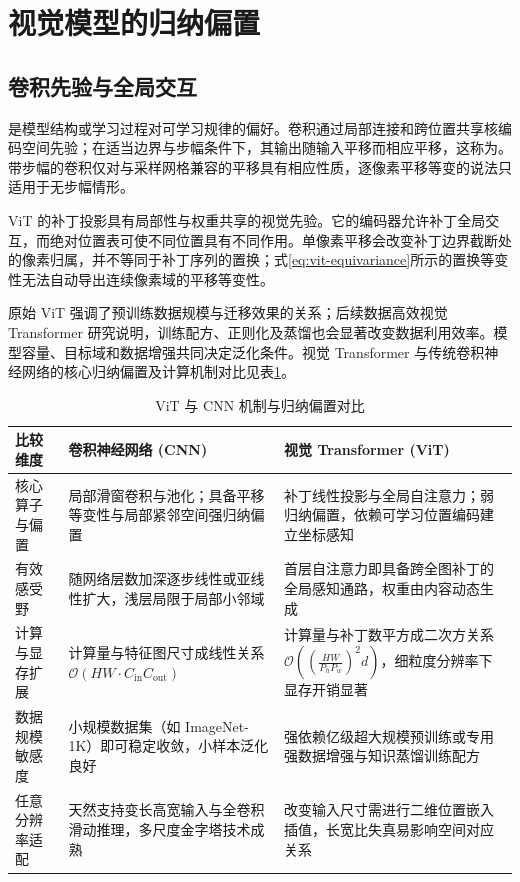 \documentclass[../textbook.tex]{subfiles}
\begin{document}
\section{视觉模型的归纳偏置}

\subsection{卷积先验与全局交互}
是模型结构或学习过程对可学习规律的偏好。卷积通过局部连接和跨位置共享核编码空间先验；在适当边界与步幅条件下，其输出随输入平移而相应平移，这称为。带步幅的卷积仅对与采样网格兼容的平移具有相应性质，逐像素平移等变的说法只适用于无步幅情形。

ViT 的补丁投影具有局部性与权重共享的视觉先验。它的编码器允许补丁全局交互，而绝对位置表可使不同位置具有不同作用。单像素平移会改变补丁边界截断处的像素归属，并不等同于补丁序列的置换；式\eqref{eq:vit-equivariance}所示的置换等变性无法自动导出连续像素域的平移等变性。

原始 ViT 强调了预训练数据规模与迁移效果的关系；后续数据高效视觉 Transformer 研究说明，训练配方、正则化及蒸馏也会显著改变数据利用效率\cite{touvron2021deit}。模型容量、目标域和数据增强共同决定泛化条件。视觉 Transformer 与传统卷积神经网络的核心归纳偏置及计算机制对比见表\ref{tab:vit-vs-cnn}。

\begin{table}[htbp]
\centering
\caption{ViT 与 CNN 机制与归纳偏置对比}\label{tab:vit-vs-cnn}
\begin{tabularx}{\linewidth}{@{}p{2.2cm}p{5.2cm}X@{}}
\toprule
比较维度 & 卷积神经网络 (CNN) & 视觉 Transformer (ViT)\\
\midrule
核心算子与偏置 & 局部滑窗卷积与池化；具备平移等变性与局部紧邻空间强归纳偏置 & 补丁线性投影与全局自注意力；弱归纳偏置，依赖可学习位置编码建立坐标感知\\
有效感受野 & 随网络层数加深逐步线性或亚线性扩大，浅层局限于局部小邻域 & 首层自注意力即具备跨全图补丁的全局感知通路，权重由内容动态生成\\
计算与显存扩展 & 计算量与特征图尺寸成线性关系 $\mathcal{O}(HW \cdot C_{\mathrm{in}} C_{\mathrm{out}})$ & 计算量与补丁数平方成二次方关系 $\mathcal{O}\left(\left(\frac{HW}{P_h P_w}\right)^2 d\right)$，细粒度分辨率下显存开销显著\\
数据规模敏感度 & 小规模数据集（如 ImageNet-1K）即可稳定收敛，小样本泛化良好 & 强依赖亿级超大规模预训练或专用强数据增强与知识蒸馏训练配方\\
任意分辨率适配 & 天然支持变长高宽输入与全卷积滑动推理，多尺度金字塔技术成熟 & 改变输入尺寸需进行二维位置嵌入插值，长宽比失真易影响空间对应关系\\
\bottomrule
\end{tabularx}
\end{table}
\end{document}

